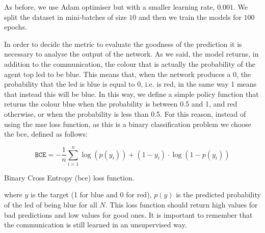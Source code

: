 As before, we use Adam optimiser but with a smaller learning rate, $0.001$. 
We split the dataset in mini-batches of size $10$ and then we train the models for 
$100$ epochs. 

In order to decide the metric to evaluate the goodness of the prediction it is 
necessary to analyse the output of the network. As we said, the model returns, in 
addition to the communication, the colour that is actually the probability of the 
agent top \gls{led} to be blue. This means that, when the network produces a 0, 
the probability that the \gls{led} is blue is equal to 0, i.e. is red, in the same way 1 
means that instead this will be blue. In this way, we define a simple policy function 
that returns the colour blue when the probability is between 0.5 and 1, and red 
otherwise, or when the probability is less than 0.5.
For this reason, instead of using the \gls{mse} loss function, as this is a binary 
classification problem we choose the \gls{bce}, defined as follows:
\begin{Equation}[H]
	\centering
	\begin{equation}
	\mathtt{BCE} = -\frac{1}{n} \sum_{i=1}^n \log(p(y_i)) + (1-y_i) \cdot \log(1 - 
	p(y_i))
	\end{equation}
	\caption{Binary Cross Entropy (\gls{bce}) loss function.}
	\label{eq:bce}
\end{Equation}
where $y$ is the target (1 for blue and 0 for red), $p(y)$ is the predicted 
probability of the \gls{led} of being blue for all $N$.
This loss function should return high values for bad predictions and low values for 
good ones.
It is important to remember that the communication is still learned in an 
unsupervised way.

